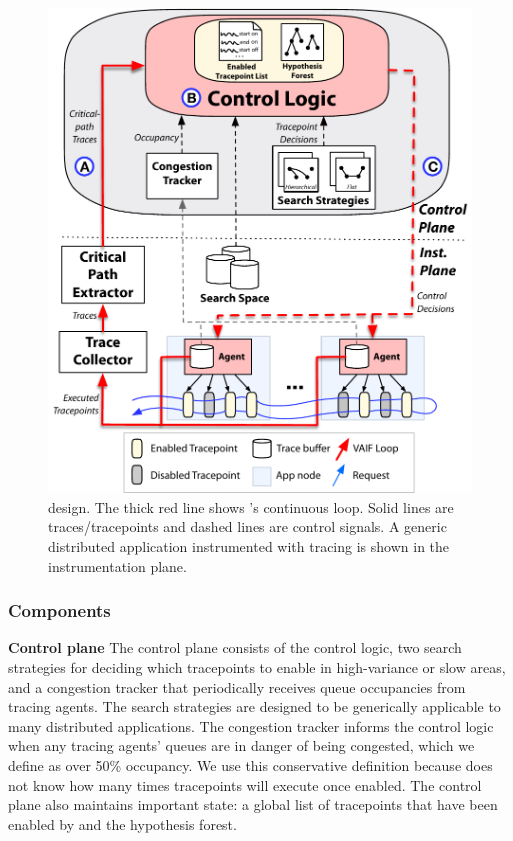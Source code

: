 \begin{figure}[tb]
    \centering
    \includegraphics[width=\columnwidth]{figures/fig_staif_design.pdf}
  
    \caption{\STAIF{} design. The thick red line shows \STAIF{}'s
      continuous loop.  Solid lines are traces/tracepoints and dashed
      lines are control signals.  A generic distributed application
      instrumented with tracing is shown in the instrumentation plane.}
    
    \label{fig:staif_design}
     \vspace{-0.2in}
  \end{figure}


  \subsubsection{Components}
  \label{sec:design:components}
  \noindent\textbf{Control plane} The control plane consists of the
  control logic, two search strategies for deciding which tracepoints to
  enable in high-variance or slow areas, and a congestion tracker that
  periodically receives queue occupancies from tracing agents.  The
  search strategies are designed to be generically applicable to many
  distributed applications.  The congestion tracker informs the control
  logic when any tracing agents' queues are in danger of being
  congested, which we define as over 50\% occupancy.  We use this
  conservative definition because \STAIF{} does not know how many times
  tracepoints will execute once enabled.  The control plane also
  maintains important state: a global list of tracepoints that have been
  enabled by \STAIF{}{} and the hypothesis forest.
  
